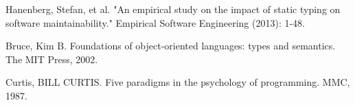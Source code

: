 \documentclass[preprint]{sigplanconf}
\begin{document}
\begin{thebibliography}{}
Hanenberg, Stefan, et al. "An empirical study on the impact of static typing on software maintainability." Empirical Software Engineering (2013): 1-48.

Bruce, Kim B. Foundations of object-oriented languages: types and semantics. The MIT Press, 2002.

Curtis, BILL CURTIS. Five paradigms in the psychology of programming. MMC, 1987.

\end{thebibliography}
\end{document}
